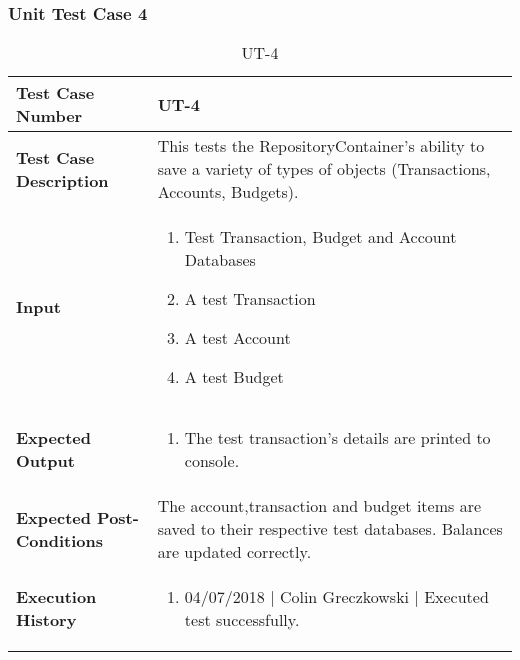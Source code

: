 \documentclass[12pt]{article}
\begin{document}
\subsubsection{Unit Test Case 4} \label{tc:1}
\def\arraystretch{1.5}%
\begin{table}[htbp]
\centering
\caption {UT-4}
\label{UT-4}
\begin{tabularx}{\textwidth}{ | l | X |}
\hline
\textbf{Test Case Number}      &  UT-4                         \\ \hline
\textbf{Test Case Description}    &  This tests the RepositoryContainer's ability to save a variety of types of objects (Transactions, Accounts, Budgets).                \\ \hline
\textbf{Input}         & 	\begin{enumerate}
          \item Test Transaction, Budget and Account Databases
	\item A test Transaction
	\item A test Account
	\item A test Budget
\end{enumerate} \\ \hline

\textbf{Expected Output}     & \begin{enumerate}
	\item The test transaction's details are printed to console.
\end{enumerate} \\ \hline
\textbf{Expected Post-Conditions}           & The account,transaction and budget items are saved to their respective test databases. Balances are updated correctly.                \\ \hline
\textbf{Execution History}   &  \begin{enumerate}
	\item 04/07/2018 | Colin Greczkowski | Executed test successfully.
\end {enumerate} \\ \hline
\end{tabularx}
\end{table}
\clearpage
\end{document}
